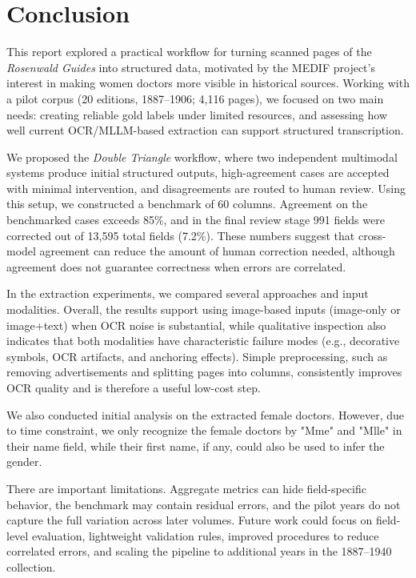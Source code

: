 
\chapter{Conclusion}
\label{chap:conclusion}

This report explored a practical workflow for turning scanned pages of the \textit{Rosenwald Guides} into structured data, motivated by the MEDIF project’s interest in making women doctors more visible in historical sources. Working with a pilot corpus (20 editions, 1887--1906; 4{,}116 pages), we focused on two main needs: creating reliable gold labels under limited resources, and assessing how well current OCR/MLLM-based extraction can support structured transcription.

We proposed the \textit{Double Triangle} workflow, where two independent multimodal systems produce initial structured outputs, high-agreement cases are accepted with minimal intervention, and disagreements are routed to human review. Using this setup, we constructed a benchmark of 60 columns. Agreement on the benchmarked cases exceeds 85\%, and in the final review stage 991 fields were corrected out of 13{,}595 total fields (7.2\%). These numbers suggest that cross-model agreement can reduce the amount of human correction needed, although agreement does not guarantee correctness when errors are correlated.

In the extraction experiments, we compared several approaches and input modalities. Overall, the results support using image-based inputs (image-only or image+text) when OCR noise is substantial, while qualitative inspection also indicates that both modalities have characteristic failure modes (e.g., decorative symbols, OCR artifacts, and anchoring effects). Simple preprocessing, such as removing advertisements and splitting pages into columns, consistently improves OCR quality and is therefore a useful low-cost step.

We also conducted initial analysis on the extracted female doctors. However, due to time constraint, we only recognize the female doctors by "Mme" and "Mlle" in their name field, while their first name, if any, could also be used to infer the gender.

There are important limitations. Aggregate metrics can hide field-specific behavior, the benchmark may contain residual errors, and the pilot years do not capture the full variation across later volumes. Future work could focus on field-level evaluation, lightweight validation rules, improved procedures to reduce correlated errors, and scaling the pipeline to additional years in the 1887--1940 collection.


